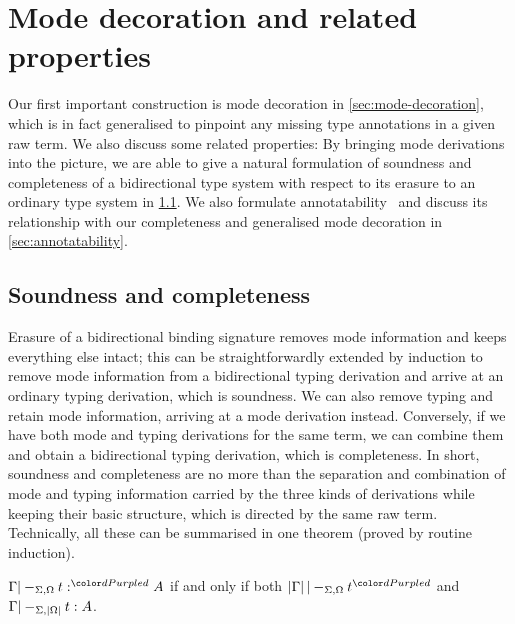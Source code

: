
\section{Mode decoration and related properties}\label{sec:pre-synthesis}

Our first important construction is mode decoration in \cref{sec:mode-decoration}, which is in fact generalised to pinpoint any missing type annotations in a given raw term.
We also discuss some related properties:
By bringing mode derivations into the picture, we are able to give a natural formulation of soundness and completeness of a bidirectional type system with respect to its erasure to an ordinary type system in \cref{sec:soundness-and-completeness}.
We also formulate annotatability~\cite{Dunfield2021} and discuss its relationship with our completeness and generalised mode decoration in \cref{sec:annotatability}.

\subsection{Soundness and completeness}
\label{sec:soundness-and-completeness}


Erasure of a bidirectional binding signature removes mode information and keeps everything else intact; this can be straightforwardly extended by induction to remove mode information from a bidirectional typing derivation and arrive at an ordinary typing derivation, which is soundness.
We can also remove typing and retain mode information, arriving at a mode derivation instead.
Conversely, if we have both mode and typing derivations for the same term, we can combine them and obtain a bidirectional typing derivation, which is completeness.
In short, soundness and completeness are no more than the separation and combination of mode and typing information carried by the three kinds of derivations while keeping their basic structure, which is directed by the same raw term.
Technically, all these can be summarised in one theorem (proved by routine induction).

\begin{theorem}\label{lem:soundness-completeness}
$\Gamma |-_{\Sigma, \Omega} t :^\dir{d} A$ if and only if both\/ $\erase\Gamma |-_{\Sigma, \Omega} t^\dir{d}$ and\/ $\Gamma |-_{\Sigma, \left|\Omega\right|} t : A$.
\end{theorem}

